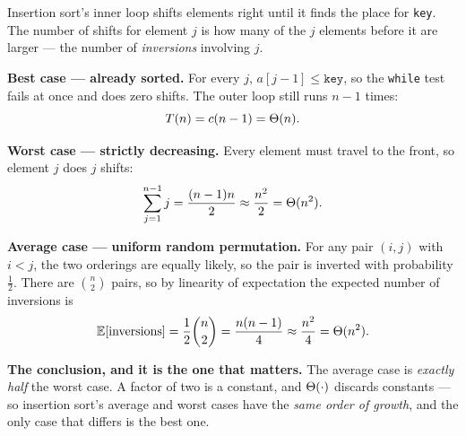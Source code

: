 Insertion sort's inner loop shifts elements right until it finds the place for
\texttt{key}. The number of shifts for element $j$ is how many of the $j$
elements before it are larger --- the number of \emph{inversions} involving
$j$.

\begin{worked}
\textbf{Best case --- already sorted.} For every $j$, $a[j-1] \le \texttt{key}$,
so the \texttt{while} test fails at once and does zero shifts. The outer loop
still runs $n-1$ times:
\[ T(n) = c(n-1) = \Theta(n). \]

\smallskip
\textbf{Worst case --- strictly decreasing.} Every element must travel to the
front, so element $j$ does $j$ shifts:
\[ \sum_{j=1}^{n-1} j = \frac{(n-1)n}{2} \approx \frac{n^{2}}{2}
   = \Theta(n^{2}). \]

\smallskip
\textbf{Average case --- uniform random permutation.} For any pair $(i,j)$ with
$i<j$, the two orderings are equally likely, so the pair is inverted with
probability $\tfrac12$. There are $\binom{n}{2}$ pairs, so by linearity of
expectation the expected number of inversions is
\[ \mathbb{E}[\text{inversions}] = \frac12\binom{n}{2}
   = \frac{n(n-1)}{4} \approx \frac{n^{2}}{4} = \Theta(n^{2}). \]

\smallskip
\textbf{The conclusion, and it is the one that matters.} The average case is
\emph{exactly half} the worst case. A factor of two is a constant, and
$\Theta(\cdot)$ discards constants --- so insertion sort's average and worst
cases have the \emph{same order of growth}, and the only case that differs is
the best one.
\end{worked}

